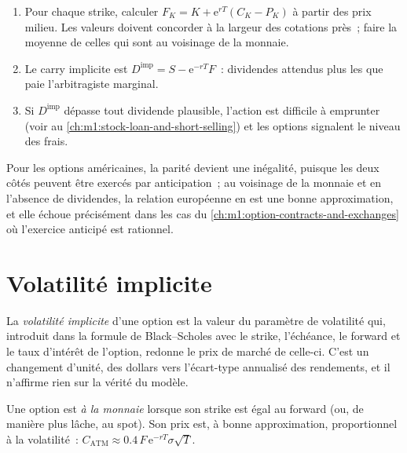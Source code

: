 \begin{method}\label{met:m1:volatility-first-contact:forward}
\begin{enumerate}
\item Pour chaque strike, calculer $F_K = K + \mathrm{e}^{rT}(C_K - P_K)$ à partir
des prix milieu. Les valeurs doivent concorder à la largeur des cotations près~; faire la
moyenne de celles qui sont au voisinage de la monnaie.
\item Le carry implicite est $D^{\text{imp}} = S - \mathrm{e}^{-rT}F$~: dividendes attendus
plus les  que paie l'arbitragiste marginal.
\item Si $D^{\text{imp}}$ dépasse tout dividende plausible, l'action est difficile
à emprunter (voir au \cref{ch:m1:stock-loan-and-short-selling}) et les options signalent
le niveau des frais.
\end{enumerate}
\end{method}

Pour les options américaines, la parité devient une inégalité, puisque les deux côtés peuvent être
exercés par anticipation~; au voisinage de la monnaie et en l'absence de dividendes, la relation européenne
en est une bonne approximation, et elle échoue précisément dans les cas du
\cref{ch:m1:option-contracts-and-exchanges} où l'exercice anticipé est
rationnel.

\section{Volatilité implicite}

\begin{definition}\label{def:m1:volatility-first-contact:iv}
La \emph{volatilité implicite} d'une option est la
valeur du paramètre de volatilité qui, introduit dans la formule de Black--Scholes
avec le strike, l'échéance, le forward et le taux d'intérêt de l'option, redonne
le prix de marché de celle-ci. C'est un changement d'unité, des dollars vers l'écart-type annualisé
des rendements, et il n'affirme rien sur la vérité du modèle.
\end{definition}

\begin{definition}[À la monnaie]\label{def:m1:volatility-first-contact:atm}
Une option est \emph{à la monnaie} lorsque son strike est égal
au forward (ou, de manière plus lâche, au spot). Son prix est, à bonne approximation,
proportionnel à la volatilité~:
$C_{\text{ATM}} \approx 0.4\,F\,\mathrm{e}^{-rT}\sigma\sqrt{T}$.
\end{definition}

